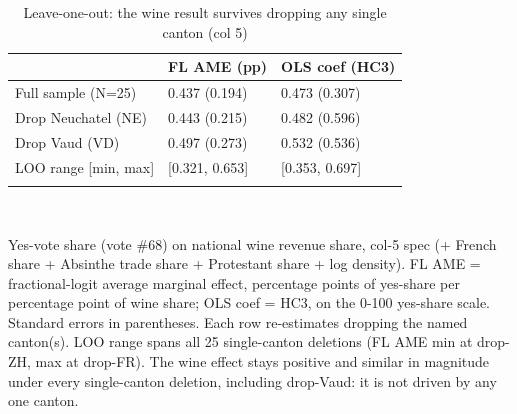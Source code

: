 \begin{table}[tbp] \centering
{}

\caption{Leave-one-out: the wine result survives dropping any single canton (col 5)}
\label{tab:T_loo_gate}
\begin{tabularx}{\linewidth}{@{}lCC@{}}

\toprule
{ }&{FL AME (pp)}&{OLS coef (HC3)} \tabularnewline
\midrule \addlinespace[\belowrulesep]
Full sample (N=25)&0.437 (0.194)&0.473 (0.307) \tabularnewline
Drop Neuchatel (NE)&0.443 (0.215)&0.482 (0.596) \tabularnewline
Drop Vaud (VD)&0.497 (0.273)&0.532 (0.536) \tabularnewline
LOO range [min, max]&[0.321, 0.653]&[0.353, 0.697] \tabularnewline
\bottomrule \addlinespace[\belowrulesep]

\end{tabularx}
\\ \parbox{\linewidth}{\footnotesize Yes-vote share (vote \#68) on national wine revenue share, col-5 spec (+ French share + Absinthe trade share + Protestant share + log density). FL AME = fractional-logit average marginal effect, percentage points of yes-share per percentage point of wine share; OLS coef = HC3, on the 0-100 yes-share scale. Standard errors in parentheses. Each row re-estimates dropping the named canton(s). LOO range spans all 25 single-canton deletions (FL AME min at drop-ZH, max at drop-FR). The wine effect stays positive and similar in magnitude under every single-canton deletion, including drop-Vaud: it is not driven by any one canton.}
\end{table}

